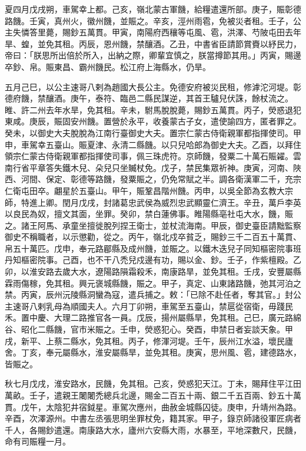 \begin{pinyinscope}
 夏四月戊戌朔，車駕幸上都。己亥，嶺北蒙古軍饑，給糧遣還所部。庚子，賑彰德路饑。壬寅，真州火，徽州饑，並賑之。辛亥，涇州雨雹，免被災者租。壬子，公主失憐答里薨，賜鈔五萬貫。甲寅，南陽府西穰等屯風、雹，洪澤、芍陂屯田去年旱、蝗，並免其租。丙辰，恩州饑，禁釀酒。乙丑，中書省臣請節賞賚以紓民力，帝曰：「朕思所出倍於所入，出納之際，卿輩宜慎之，朕當撙節其用。」丙寅，賜邊卒鈔、帛。賑東昌、霸州饑民。松江府上海縣水，仍旱。



 五月己巳，以公主速哥八剌為趙國大長公主。免德安府被災民租，修滹沱河堤。彰德府饑，禁釀酒。庚午，泰符、臨邑二縣民謀逆，其首王驢兒伏誅，餘杖流之。睢、許二州去年水旱，免其租。辛未，駙馬脫脫薨，賜鈔五萬貫。丙子，熒惑退犯東咸。庚辰，賑固安州饑。置營於永平，收養蒙古子女，遣使諭四方，匿者罪之。癸未，以御史大夫脫脫為江南行臺御史大夫。置宗仁蒙古侍衛親軍都指揮使司。甲申，車駕幸五臺山。賑夏津、永清二縣饑。以只兒哈郎為御史大夫。乙酉，以拜住領宗仁蒙古侍衛親軍都指揮使司事，佩三珠虎符。京師饑，發粟二十萬石賑糴。雲南行省平章答失鐵木兒、朵兒只坐贓杖免。戊子，禁民集眾祈神。庚寅，河南、陜西、河間、保定、彰德等路饑，發粟賑之，仍免常賦之半。調各衛漢軍二千，充宗仁衛屯田卒。翽星於五臺山。甲午，賑鞏昌階州饑。丙申，以吳全節為玄教大宗師，特進上卿。閏月戊戌，封諸葛忠武侯為威烈忠武顯靈仁濟王。辛丑，萬戶李英以良民為奴，擅文其面，坐罪。癸卯，禁白蓮佛事。睢陽縣亳社屯大水，饑，賑之。諸王阿馬、承童坐擅徙脫列捏王衛士，並杖流海南。甲辰，御史臺臣請黜監察御史不稱職者，以示懲勸，從之。丙午，嶺北戍卒貧乏，賜鈔三千二百五十萬貫、帛五十萬匹。戊申，奉元路郿縣及成州饑，並賑之。以鐵木迭兒子同知樞密院事班丹知樞密院事。己酉，也不干八禿兒戍邊有功，賜以金、鈔。壬子，作紫檀殿。乙卯，以淮安路去歲大水，遼陽路隕霜殺禾，南康路旱，並免其租。壬戌，安豐屬縣霖雨傷稼，免其租。興元褒城縣饑，賑之。甲子，真定、山東諸路饑，弛其河泊之禁。丙寅，辰州沅陵縣洞蠻為寇，遣兵捕之。敕：「已除不赴任者，奪其官。」封公主速哥八剌乳母為順國夫人。六月丁卯朔，車駕至五臺山，禁扈從宿衛，毋踐民禾。置中慶、大理二路推官各一員。戊辰，揚州屬縣旱，免其租。己巳，廣元路綿谷、昭化二縣饑，官市米賑之。壬申，熒惑犯心。癸酉，申禁日者妄談天象。甲戌，新平、上蔡二縣水，免其租。丙子，修渾河堤。壬午，辰州江水溢，壞民廬舍。丁亥，奉元屬縣水，淮安屬縣旱，並免其租。庚寅，思州風、雹，建德路水，皆賑之。



 秋七月戊戌，淮安路水，民饑，免其租。己亥，熒惑犯天江。丁未，賜拜住平江田萬畝。壬子，遣親王闍闍禿總兵北邊，賜金二百五十兩、銀二千五百兩、鈔五十萬貫。戊午，太陰犯井宿鉞星。車駕次應州，曲赦金城縣囚徒。庚申，升靖州為路。辛酉，次澤源州。中書左丞張思明坐罪杖免，籍其家。甲子，錄京師諸役軍匠病者千人，各賜鈔遣還。南康路大水，廬州六安縣大雨，水暴至，平地深數尺，民饑，命有司賑糧一月。




\end{pinyinscope}
